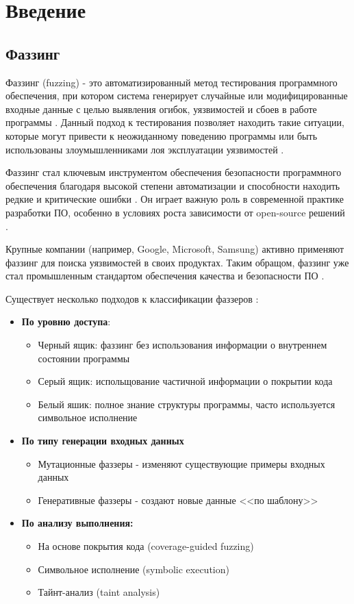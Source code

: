 \section{Введение}
\subsection{Фаззинг}
Фаззинг (fuzzing) - это автоматизированный метод тестирования программного обеспечения, при котором система генерирует случайные или модифицированные входные данные с целью выявления огибок, уязвимостей и сбоев в работе программы \cite{Kuliamin}. Данный подход к тестирования позволяет находить такие ситуации, которые могут привести к неожиданному поведению программы или быть использованы злоумышленниками лоя эксплуатации уязвимостей \cite{Manes}.

Фаззинг стал ключевым инструментом обеспечения безопасности программного обеспечения благодаря высокой степени автоматизации и способности находить редкие и критические ошибки \cite{Manes}. Он играет важную роль в современной практике разработки ПО, особенно в условиях роста зависимости от open-source решений \cite{Boehme}.

Крупные компании (например, Google, Microsoft, Samsung) активно применяют фаззинг для поиска уязвимостей в своих продуктах. Таким обращом, фаззинг уже стал промышленным стандартом обеспечения качества и безопасности ПО \cite{Boehme}.

Существует несколько подходов к классификации фаззеров \cite{Kuliamin}\cite{Boehme}:
\begin{itemize}
	\item \textbf{По уровню доступа}:
	\begin{itemize}
		\item Черный ящик: фаззинг без использования информации о внутреннем состоянии программы
		\item Серый ящик: испольщование частичной информации о покрытии кода
		\item Белый яшик: полное знание структуры программы, часто используется символьное исполнение
	\end{itemize}
	\item \textbf{По типу генерации входных данных}
	\begin{itemize}
		\item Мутационные фаззеры - изменяют существующие примеры входных данных
		\item Генеративные фаззеры - создают новые данные <<по шаблону>>
	\end{itemize}
	\item \textbf{По анализу выполнения:}
	\begin{itemize}
		\item На основе покрытия кода (coverage-guided fuzzing)
		\item Символьное исполнение (symbolic execution)
		\item Тайнт-анализ (taint analysis)
	\end{itemize}
\end{itemize}

